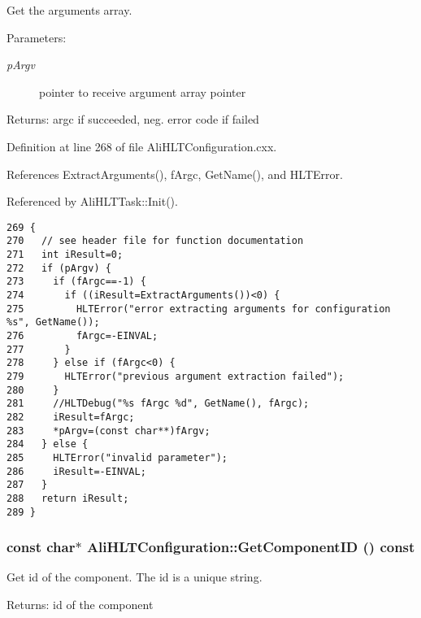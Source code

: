 Get the arguments array. \begin{Desc}
\item[Parameters:]
\begin{description}
\item[{\em p\-Argv}]pointer to receive argument array pointer \end{description}
\end{Desc}
\begin{Desc}
\item[Returns:]argc if succeeded, neg. error code if failed \end{Desc}


Definition at line 268 of file Ali\-HLTConfiguration.cxx.

References Extract\-Arguments(), f\-Argc, Get\-Name(), and HLTError.

Referenced by Ali\-HLTTask::Init().

\footnotesize\begin{verbatim}269 {
270   // see header file for function documentation
271   int iResult=0;
272   if (pArgv) {
273     if (fArgc==-1) {
274       if ((iResult=ExtractArguments())<0) {
275         HLTError("error extracting arguments for configuration %s", GetName());
276         fArgc=-EINVAL;
277       }
278     } else if (fArgc<0) {
279       HLTError("previous argument extraction failed");
280     }
281     //HLTDebug("%s fArgc %d", GetName(), fArgc);
282     iResult=fArgc;
283     *pArgv=(const char**)fArgv;
284   } else {
285     HLTError("invalid parameter");
286     iResult=-EINVAL;
287   }
288   return iResult;
289 }
\end{verbatim}\normalsize 


\subsubsection{\setlength{\rightskip}{0pt plus 5cm}const char$\ast$ Ali\-HLTConfiguration::Get\-Component\-ID () const\hspace{0.3cm}{\tt  [inline]}}\label{classAliHLTConfiguration_a6}


Get id of the component. The id is a unique string. \begin{Desc}
\item[Returns:]id of the component \end{Desc}


